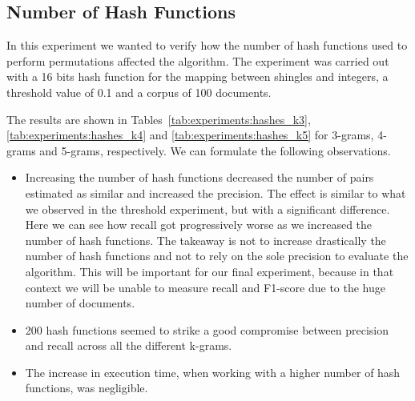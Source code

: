 \documentclass[runningheads]{llncs}
\begin{document}
\subsection{Number of Hash Functions}
\label{subsec:experiments:hashes}

In this experiment we wanted to verify how the number of hash functions used to perform permutations affected the algorithm. The experiment was carried out with a 16 bits hash function for the mapping between shingles and integers, a threshold value of 0.1 and a corpus of 100 documents.

The results are shown in Tables~\ref{tab:experiments:hashes_k3}, \ref{tab:experiments:hashes_k4} and \ref{tab:experiments:hashes_k5} for 3-grams, 4-grams and 5-grams, respectively. We can formulate the following observations.

\begin{itemize}
  \item Increasing the number of hash functions decreased the number of pairs estimated as similar and increased the precision. The effect is similar to what we observed in the threshold experiment, but with a significant difference. Here we can see how recall got progressively worse as we increased the number of hash functions. The takeaway is not to increase drastically the number of hash functions and not to rely on the sole precision to evaluate the algorithm. This will be important for our final experiment, because in that context we will be unable to measure recall and F1-score due to the huge number of documents. 
  \item 200 hash functions seemed to strike a good compromise between precision and recall across all the different k-grams.
  \item The increase in execution time, when working with a higher number of hash functions, was negligible.
\end{itemize}
\end{document}
